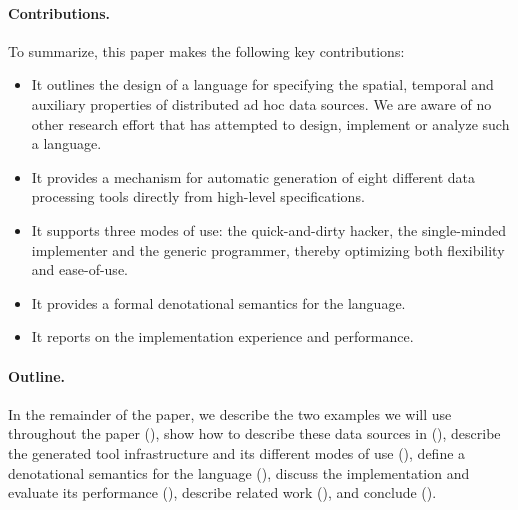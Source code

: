 \paragraph*{Contributions.}  To summarize, this paper makes the
following key contributions:


\begin{itemize}
\item It outlines the design of a language for specifying the 
spatial, temporal and auxiliary properties of distributed ad hoc data
sources.  We are aware of no other research effort that has attempted
to design, implement or analyze such a language.

\item It provides a mechanism for automatic generation of eight different
data processing tools directly from high-level specifications.

\item It supports three modes of use:
the quick-and-dirty hacker, the single-minded implementer and the generic 
programmer, thereby optimizing both flexibility and ease-of-use.

\item It provides a formal denotational semantics for the language.

\item It reports on the implementation experience and performance.
\end{itemize}

\paragraph{Outline.}
In the remainder of the paper, we describe the two examples we will
use throughout the paper (), show how to describe
these data sources in \padsd{} (), describe
the generated tool infrastructure and its different modes of use
(), define a denotational semantics for the
language (), discuss the implementation and
evaluate its performance (), describe
related work (), and conclude
(). 


